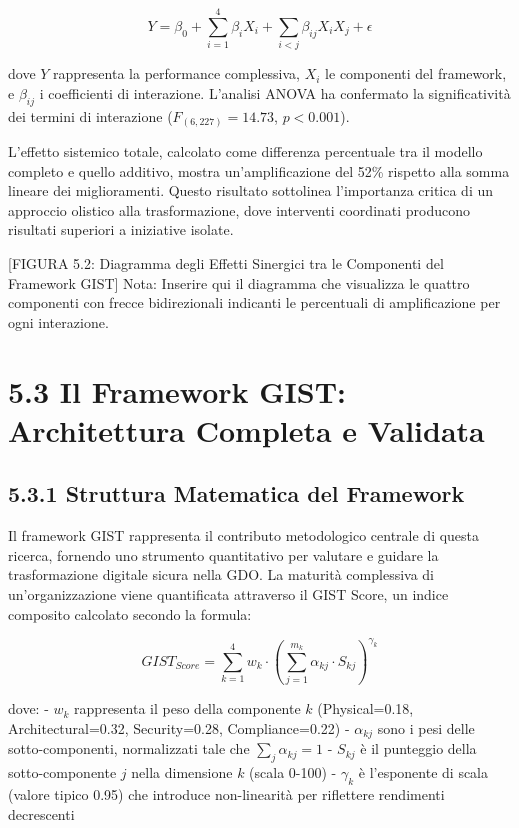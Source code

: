 $$Y = \beta_0 + \sum_{i=1}^{4} \beta_i X_i + \sum_{i<j} \beta_{ij} X_i X_j + \epsilon$$

dove $Y$ rappresenta la performance complessiva, $X_i$ le componenti del framework, e $\beta_{ij}$ i coefficienti di interazione. L'analisi ANOVA ha confermato la significatività dei termini di interazione ($F_{(6,227)} = 14.73$, $p < 0.001$).

L'effetto sistemico totale, calcolato come differenza percentuale tra il modello completo e quello additivo, mostra un'amplificazione del 52\% rispetto alla somma lineare dei miglioramenti. Questo risultato sottolinea l'importanza critica di un approccio olistico alla trasformazione, dove interventi coordinati producono risultati superiori a iniziative isolate.

[FIGURA 5.2: Diagramma degli Effetti Sinergici tra le Componenti del Framework GIST]
Nota: Inserire qui il diagramma che visualizza le quattro componenti con frecce bidirezionali indicanti le percentuali di amplificazione per ogni interazione.

\section{5.3 Il Framework GIST: Architettura Completa e Validata}

\subsection{5.3.1 Struttura Matematica del Framework}

Il framework GIST rappresenta il contributo metodologico centrale di questa ricerca, fornendo uno strumento quantitativo per valutare e guidare la trasformazione digitale sicura nella GDO. La maturità complessiva di un'organizzazione viene quantificata attraverso il GIST Score, un indice composito calcolato secondo la formula:

$$GIST_{Score} = \sum_{k=1}^{4} w_k \cdot \left( \sum_{j=1}^{m_k} \alpha_{kj} \cdot S_{kj} \right)^{\gamma_k}$$

dove:
- $w_k$ rappresenta il peso della componente $k$ (Physical=0.18, Architectural=0.32, Security=0.28, Compliance=0.22)
- $\alpha_{kj}$ sono i pesi delle sotto-componenti, normalizzati tale che $\sum_j \alpha_{kj} = 1$
- $S_{kj}$ è il punteggio della sotto-componente $j$ nella dimensione $k$ (scala 0-100)
- $\gamma_k$ è l'esponente di scala (valore tipico 0.95) che introduce non-linearità per riflettere rendimenti decrescenti

